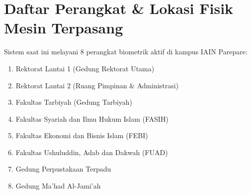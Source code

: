\documentclass[12pt,a4paper]{article}
\begin{document}
\section{Daftar Perangkat \& Lokasi Fisik Mesin Terpasang}
Sistem saat ini melayani 8 perangkat biometrik aktif di kampus IAIN Parepare:
\begin{enumerate}
    \item Rektorat Lantai 1 (Gedung Rektorat Utama)
    \item Rektorat Lantai 2 (Ruang Pimpinan \& Administrasi)
    \item Fakultas Tarbiyah (Gedung Tarbiyah)
    \item Fakultas Syariah dan Ilmu Hukum Islam (FASIH)
    \item Fakultas Ekonomi dan Bisnis Islam (FEBI)
    \item Fakultas Ushuluddin, Adab dan Dakwah (FUAD)
    \item Gedung Perpustakaan Terpadu
    \item Gedung Ma'had Al-Jami'ah
\end{enumerate}
\end{document}

